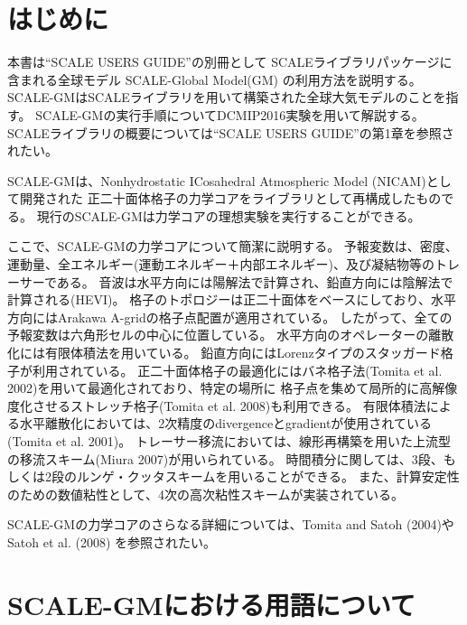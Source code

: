\section{はじめに}

本書は``SCALE USERS GUIDE''の別冊として
SCALEライブラリパッケージに含まれる全球モデル SCALE-Global Model(GM) の利用方法を説明する。
SCALE-GMはSCALEライブラリを用いて構築された全球大気モデルのことを指す。
SCALE-GMの実行手順についてDCMIP2016実験を用いて解説する。
SCALEライブラリの概要については``SCALE USERS GUIDE''の第1章を参照されたい。


SCALE-GMは、Nonhydrostatic ICosahedral Atmospheric Model (NICAM)として開発された
正二十面体格子の力学コアをライブラリとして再構成したものでる。
現行のSCALE-GMは力学コアの理想実験を実行することができる。



ここで、SCALE-GMの力学コアについて簡潔に説明する。
予報変数は、密度、運動量、全エネルギー(運動エネルギー＋内部エネルギー)、及び凝結物等のトレーサーである。
音波は水平方向には陽解法で計算され、鉛直方向には陰解法で計算される(HEVI)。
格子のトポロジーは正二十面体をベースにしており、水平方向にはArakawa A-gridの格子点配置が適用されている。
したがって、全ての予報変数は六角形セルの中心に位置している。
水平方向のオペレーターの離散化には有限体積法を用いている。
鉛直方向にはLorenzタイプのスタッガード格子が利用されている。
正二十面体格子の最適化にはバネ格子法(Tomita et al. 2002)を用いて最適化されており、特定の場所に
格子点を集めて局所的に高解像度化させるストレッチ格子(Tomita et al. 2008)も利用できる。
有限体積法による水平離散化においては、2次精度のdivergenceとgradientが使用されている(Tomita et al. 2001)。
トレーサー移流においては、線形再構築を用いた上流型の移流スキーム(Miura 2007)が用いられている。
時間積分に関しては、3段、もしくは2段のルンゲ・クッタスキームを用いることができる。
また、計算安定性のための数値粘性として、4次の高次粘性スキームが実装されている。

SCALE-GMの力学コアのさらなる詳細については、Tomita and Satoh (2004)やSatoh et al. (2008)
を参照されたい。


\section{SCALE-GMにおける用語について}

